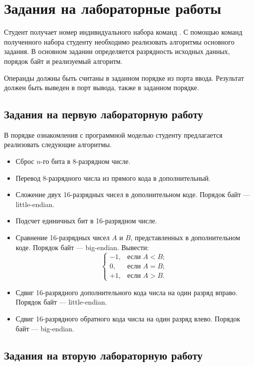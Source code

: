 \section{Задания на лабораторные работы}


Студент получает номер индивидуального набора команд \MyProc. С помощью команд полученного набора студенту необходимо реализовать алгоритмы основного задания. В основном задании определяется разрядность исходных данных, порядок байт и реализуемый алгоритм. 

Операнды должны быть считаны в заданном порядке из порта ввода. Результат  должен быть выведен в порт вывода, также в заданном порядке.

\subsection{Задания на первую лабораторную работу}

В порядке ознакомления с программной моделью {\MyProc} студенту предлагается реализовать следующие алгоритмы.

\begin{itemize}
    \item Сброс $n$-го бита в 8-разрядном числе.
    \item Перевод 8-разрядного числа из прямого кода в дополнительный.
    \item Сложение двух 16-разрядных чисел в дополнительном коде. Порядок байт --- little-endian.
    \item Подсчет единичных бит в 16-разрядном числе.
    \item Сравнение 16-разрядных чисел $A$ и $B$, представленных в дополнительном коде. Порядок байт --- big-endian. Вывести:
    \[
        \begin{cases}
            -1, &\text{если $A<B$};\\
             0, &\text{если $A=B$};\\
            +1, &\text{если $A>B$}.
        \end{cases}
    \]
    \item Сдвиг 16-разрядного дополнительного кода числа на один разряд вправо. Порядок байт --- little-endian.
    \item Сдвиг 16-разрядного обратного кода числа на один разряд влево. Порядок байт --- big-endian.
\end{itemize}


\subsection{Задания на вторую лабораторную работу}

